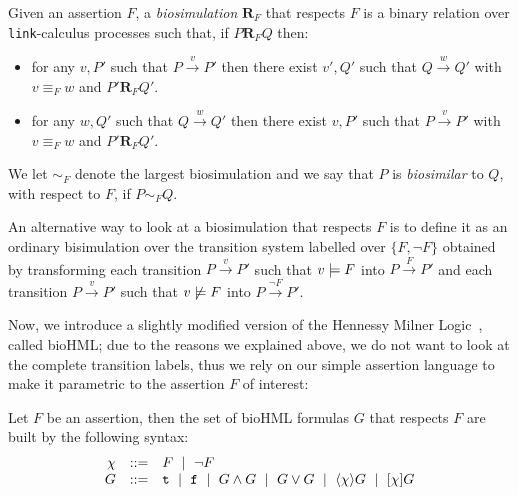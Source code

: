 \begin{definition}
Given an assertion $F$, a \emph{biosimulation} $\mathbf{R}_F$ that respects $F$ is a binary relation over {\tt link}-calculus processes such that, if $P \mathrel{\mathbf{R}_F} Q$ then:
 \begin{itemize} 
 \item
 for any $v,P'$ such that 
 $P \xrightarrow{v} P'$ then there exist $v',Q'$ such that $Q  \xrightarrow{w} Q'$ with $v\equiv_F w$ and $P' \mathrel{\mathbf{R}_F} Q'$.
\item
 for any $w,Q'$ such that 
 $Q \xrightarrow{w} Q'$ then there exist $v,P'$ such that $P  \xrightarrow{v} P'$ with $v\equiv_F w$ and $P' \mathrel{\mathbf{R}_F} Q'$.
\end{itemize}
We let $ \sim_F $ denote the largest  biosimulation and we say that $P$ is \emph{biosimilar} to $Q$, with respect to $F$, if $P \sim_F Q$.
\end{definition}

\begin{remark}
An alternative way to look at a biosimulation that respects $F$ is to define it as an ordinary bisimulation over the transition system labelled over $\{F,\neg F\}$ obtained by transforming each transition $P \xrightarrow{v} P'$ such that $v\models F$ into $P \xrightarrow{F} P'$ and  each transition $P \xrightarrow{v} P'$ such that $v\not\models F$ into $P \xrightarrow{\neg F} P'$.
\end{remark}

Now, we introduce a slightly modified version of the Hennessy Milner Logic~\cite{}, called bioHML; due to the reasons we explained above, we do not want to look at the complete transition labels, thus we rely on our simple assertion language to make it parametric to the assertion $F$ of interest:
\begin{definition}[bioHML]
Let   $F$ be an assertion, then 
the set of bioHML formulas $G$ that respects $F$ are built by the following syntax:
$$
\begin{array}{rcl}
\chi & ::= & F~\mid~ \neg F\\
G &::= &{\tt t} ~\mid~ {\tt f} ~\mid~ G\wedge G ~\mid~ G \vee G ~\mid~ \langle \chi \rangle G ~\mid~ [\chi]G
\end{array}
$$
\end{definition}

